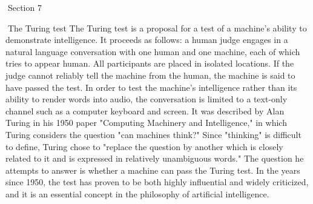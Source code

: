 Section 7




The Turing test
The Turing test is a proposal for a test of a machine's ability to demonstrate intelligence. It proceeds as follows: a human judge engages in a natural language conversation with one human and one machine, each of which tries to appear human. All participants are placed in isolated locations. If the judge cannot reliably tell the machine from the human, the machine is said to have passed the test. In order to test the machine's intelligence rather than its ability to render words into audio, the conversation is limited to a text-only channel such as a computer keyboard and screen. 
It was described by Alan Turing in his 1950 paper "Computing Machinery and Intelligence," in which Turing considers the question "can machines think?" Since "thinking" is difficult to define, Turing chose to "replace the question by another which is closely related to it and is expressed in relatively unambiguous words." The question he attempts to answer is whether a machine can pass the Turing test.
In the years since 1950, the test has proven to be both highly influential and widely criticized, and it is an essential concept in the philosophy of artificial intelligence. 
 
